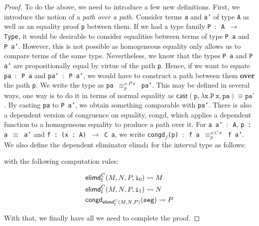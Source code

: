 \documentclass[12pt,twoside,maitrise]{dms}
\theoremstyle{definition}
\numberwithin{equation}{section}
\numberwithin{table}{chapter}
\numberwithin{figure}{chapter}
\newcommand\kw[1] {\textsf{#1}}
\newcommand\id[1] {\texttt{#1}}
\newcommand\fn[1] {\texttt{#1}}
\begin{document}
\begin{proof}
To do the above, we need to introduce a few new definitions. First, we introduce
the notion of a \emph{path over a path}\cite{licata2015cubical}. Consider terms
\id{a} and \id{a'} of type \id{A} as well as an equality proof \id{p} between
them. If we had a type family \fn{P $\colon$ A $\rightarrow$ Type}, it would be
desirable to consider equalities between terms of type \fn{P a} and \fn{P a'}.
However, this is not possible as homogeneous equality only allows us to compare
terms of the same type. Nevertheless, we know that the types \fn{P a} and \fn{P
  a'} are propositionally equal by virtue of the path \id{p}. Hence, if we want
to equate \fn{pa $\colon$ P a} and \fn{pa' $\colon$ P a'}, we would have to
construct a path between them \textbf{over} the path \id{p}. We write the type
as \fn{pa $\equiv^{x. P \ x}_{p}$ pa'}. This may be defined in several ways, one
way is to do it in terms of normal equality as $\kw{cast}(\id{p}, \lambda \id{x}
. \id{P} \ \id{x}, \id{pa}) \equiv \id{pa'}$. By casting \id{pa} to \id{P a'},
we obtain something comparable with \id{pa'}. There is also a dependent version
of congruence on equality, \kw{congd}, which applies a dependent function to a
homogeneous equality to produce a path over it. For \fn{a a' $\colon$ A}, \fn{p
  : a $\equiv$ a'} and \fn{f : (x : A) $\rightarrow$ C a}, we write
\fn{\kw{congd}$_{f}$(p) $\colon$ f a $\equiv^{x. C \ x}_{p}$ f a'}. We also
define the dependent eliminator \kw{elimd}$_{\mathrm{I}}$ for the interval type as
follows:

\begin{prooftree*}
   \infer4{\oftype{\ctx, \oftype{i}{\bI}}{\kw{elimd}_{\bI}^{C} (M, N, P, i)}{C \ i}}
\end{prooftree*}


with the following computation rules:

\begin{align*}
  & \kw{elimd}_{\bI}^{C}(M, N, P, \ileft) \rightsquigarrow{} M \\
  & \kw{elimd}_{\bI}^{C}(M, N, P, \iright) \rightsquigarrow{} N \\
  & \kw{congd}_{\kw{elimd}_{\bI}^{C}(M, N, P)}(\id{seg}) \rightsquigarrow{} P
\end{align*}


With that, we finally have all we need to complete the proof.


\end{proof}
\end{document}
